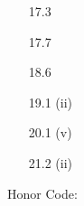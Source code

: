 \documentclass[11pt]{article}
\begin{document}
\begin{enumerate}
    \hrulefill

    \item[17.3]

    \hrulefill

    \item[17.7]

    \hrulefill

    \item[18.6]

    \hrulefill

    \item[19.1](ii)

    \hrulefill

    \item[20.1](v)

    \hrulefill

    \item[21.2](ii)

    \hrulefill

\end{enumerate}
Honor Code: \vspace*{7em}
\end{document}
